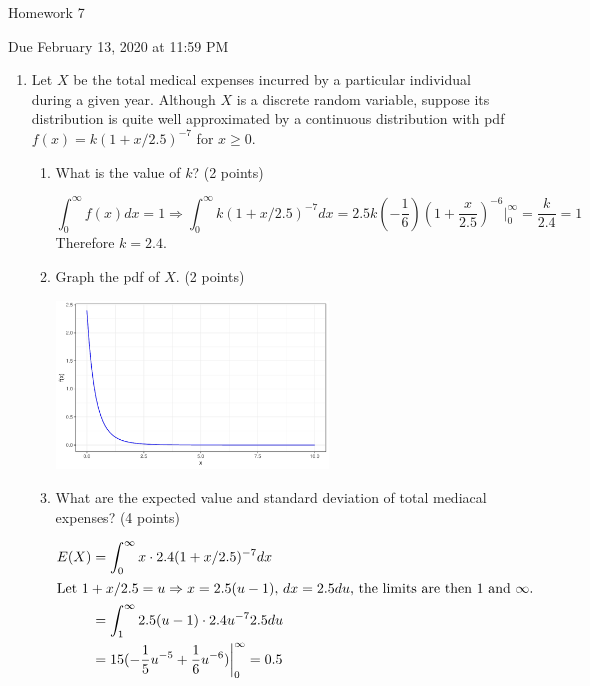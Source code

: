 \documentclass{article}\usepackage[]{graphicx}\usepackage[]{color}
\newenvironment{knitrout}{}{} %
\begin{document}
\begin{center} \LARGE
Homework 7
\end{center}
\begin{center} \Large
Due February 13, 2020 at 11:59 PM 
\end{center}



\begin{enumerate}
	\item Let $X$ be the total medical expenses incurred by a particular individual during a given year. Although $X$ is a discrete random variable, suppose its distribution is quite well approximated by a continuous distribution with pdf $f(x) = k(1 + x/2.5)^{-7}$ for $x \geq 0$.
	\begin{enumerate}
		\item {\color{black} What is the value of $k$?} (2 points)
		
		\[\int_{0}^\infty f(x) dx= 1 \Rightarrow \int_{0}^\infty k(1 + x/2.5)^{-7} dx = 2.5k (-\frac{1}{6}) (1 + \frac{x}{2.5})^{-6}\bigg|_{0}^{\infty} = \frac{k}{2.4} = 1 \]
		Therefore $k = 2.4$.
		
		
		\item {\color{black} Graph the pdf of $X$.} (2 points)
\begin{knitrout}
\color{fgcolor}

{\centering \includegraphics[width=0.6\textwidth]{figure/unnamed-chunk-2-1} 

}



\end{knitrout}
		\item {\color{black} What are the expected value and standard deviation of total mediacal expenses?} (4 points)
		
		\begin{align*}
		E(X) &= \int_{0}^\infty x \cdot 2.4 (1 + x/2.5)^{-7} dx \\
		\intertext{Let $1 + x/2.5 = u \Rightarrow x = 2.5(u-1),\, dx = 2.5du$, the limits are then 1 and $\infty$. }
		& = \int_{1}^\infty 2.5(u-1) \cdot 2.4 u^{-7} 2.5 du\\
		& = 15(-\frac{1}{5} u^{-5} + \frac{1}{6} u^{-6})\bigg|_0^\infty = 0.5
		\end{align*}
		

\end{enumerate}
\end{enumerate}
\end{document}
